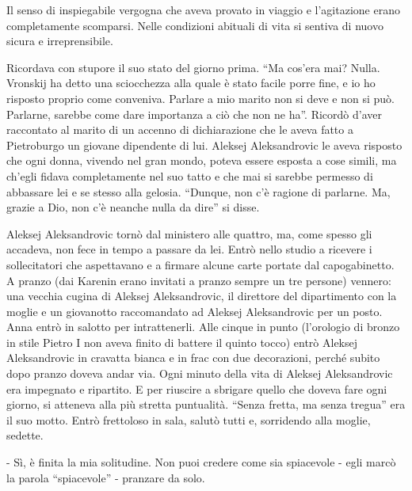 Il senso di inspiegabile vergogna che aveva provato in viaggio e l'agitazione erano completamente scomparsi. Nelle condizioni abituali di vita si sentiva di nuovo sicura e irreprensibile. 

Ricordava con stupore il suo stato del giorno prima. ``Ma cos'era mai? Nulla. Vronskij ha detto una sciocchezza alla quale è stato facile porre fine, e io ho risposto proprio come conveniva. Parlare a mio marito non si deve e non si può. Parlarne, sarebbe come dare importanza a ciò che non ne ha''. Ricordò d'aver raccontato al marito di un accenno di dichiarazione che le aveva fatto a Pietroburgo un giovane dipendente di lui. Aleksej Aleksandrovic le aveva risposto che ogni donna, vivendo nel gran mondo, poteva essere esposta a cose simili, ma ch'egli fidava completamente nel suo tatto e che mai si sarebbe permesso di abbassare lei e se stesso alla gelosia. ``Dunque, non c'è ragione di parlarne. Ma, grazie a Dio, non c'è neanche nulla da dire'' si disse. 

\label{xxxiii} 

Aleksej Aleksandrovic tornò dal ministero alle quattro, ma, come spesso gli accadeva, non fece in tempo a passare da lei. Entrò nello studio a ricevere i sollecitatori che aspettavano e a firmare alcune carte portate dal capogabinetto. A pranzo (dai Karenin erano invitati a pranzo sempre un tre persone) vennero: una vecchia cugina di Aleksej Aleksandrovic, il direttore del dipartimento con la moglie e un giovanotto raccomandato ad Aleksej Aleksandrovic per un posto. Anna entrò in salotto per intrattenerli. Alle cinque in punto (l'orologio di bronzo in stile Pietro I non aveva finito di battere il quinto tocco) entrò Aleksej Aleksandrovic in cravatta bianca e in frac con due decorazioni, perché subito dopo pranzo doveva andar via. Ogni minuto della vita di Aleksej Aleksandrovic era impegnato e ripartito. E per riuscire a sbrigare quello che doveva fare ogni giorno, si atteneva alla più stretta puntualità. ``Senza fretta, ma senza tregua'' era il suo motto. Entrò frettoloso in sala, salutò tutti e, sorridendo alla moglie, sedette. 

- Sì, è finita la mia solitudine. Non puoi credere come sia spiacevole - egli marcò la parola ``spiacevole'' - pranzare da solo. 


